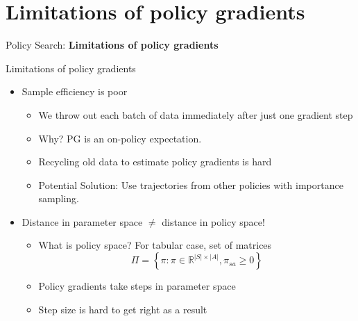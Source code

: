 \section{Limitations of policy gradients}
\begin{frame}{}
    \LARGE Policy Search: \textbf{Limitations of policy gradients}
\end{frame}

\begin{frame}{Limitations of policy gradients}
    \begin{itemize}
        \item Sample efficiency is poor
        \begin{itemize}
            \item We throw out each batch of data immediately after just one gradient step
            \item Why? PG is an on-policy expectation.
            \pause
            \item Recycling old data to estimate policy gradients is hard
            \item Potential Solution: Use trajectories from other policies with importance sampling.
        \end{itemize}
        \pause
        \item Distance in parameter space $\ne$ distance in policy space!
        \pause
        \begin{itemize}
            \item What is policy space? For tabular case, set of matrices
            $$\Pi = \left \{ \pi : \pi \in \mathbb{R}^{|S| \times |A|}, \pi_{sa} \geq 0 \right  \}$$
            \pause
            \item Policy gradients take steps in parameter space
            \item Step size is hard to get right as a result
        \end{itemize}
    \end{itemize}
\end{frame}